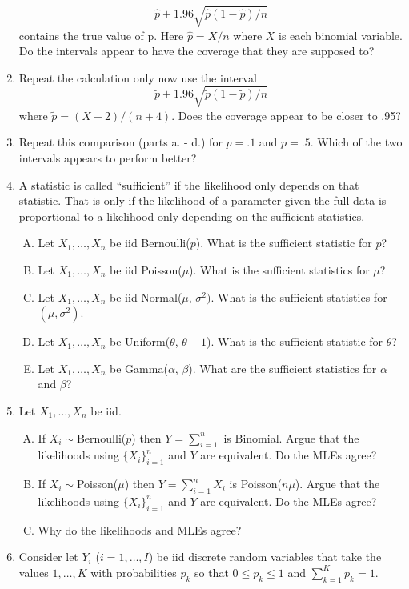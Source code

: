 \documentclass[12pt]{article}
\begin{document}
\begin{enumerate}[1.]
$$
\hat p \pm 1.96\sqrt{\hat p (1 - \hat p) / n}
$$
contains the true value of p. Here $\hat p = X/n$ where $X$ is each
binomial variable. Do the intervals appear to have the coverage that
they are supposed to?
\item Repeat the calculation only now use the interval
$$
\tilde p \pm 1.96\sqrt{\tilde p (1 - \tilde p) / n}
$$
where $\tilde p = (X + 2) / (n + 4)$. Does the coverage appear to be
closer to .95?
\item Repeat this comparison (parts a. - d.) for $p = .1$ and $p =
  .5$. Which of the two intervals appears to perform better? 
\item A statistic is called ``sufficient'' if the likelihood only depends on that statistic.
	That is only if the likelihood of a parameter given the full data is proportional to 	
	a likelihood only depending on the sufficient statistics.
	\begin{enumerate}[A.]
	\item Let $X_1,\ldots, X_n$ be iid Bernoulli($p$). What is the sufficient statistic for $p$?
	\item Let $X_1,\ldots, X_n$ be iid Poisson($\mu$). What is the sufficient statistics for $\mu$?
	\item Let $X_1,\ldots, X_n$ be iid Normal($\mu$, $\sigma^2)$. What is the sufficient statistics for $(\mu,\sigma^2)$. 
	\item Let $X_1,\ldots, X_n$ be Uniform($\theta$, $\theta+1$). What is the sufficient statistic for $\theta$?
	\item Let $X_1,\ldots, X_n$ be Gamma($\alpha$, $\beta$). What are the sufficient statistics for $\alpha$ and $\beta$?
	\end{enumerate}
\item Let $X_1,\ldots, X_n$ be iid. 
\begin{enumerate}[A.]
\item If $X_i \sim $Bernoulli($p$) then $Y = \sum_{i=1}^n$ is Binomial. Argue that the likelihoods using $\{X_i\}_{i=1}^n$ and $Y$ are equivalent. Do the MLEs agree? 
\item If $X_i \sim $Poisson($\mu$) then $Y = \sum_{i=1}^n X_i$ is Poisson($n\mu$). Argue that the likelihoods using $\{X_i\}_{i=1}^n$ and $Y$ are equivalent. Do the MLEs agree?
\item Why do the likelihoods and MLEs agree?
\end{enumerate}	
	\item Consider let $Y_i$ ($i=1,\ldots,I$) be iid discrete random variables that take the values
	$1,\ldots, K$ with probabilities $p_k$ so that $0\leq p_k \leq 1$ and $\sum_{k=1}^K p_k = 1$.

\end{enumerate}
\end{document}
